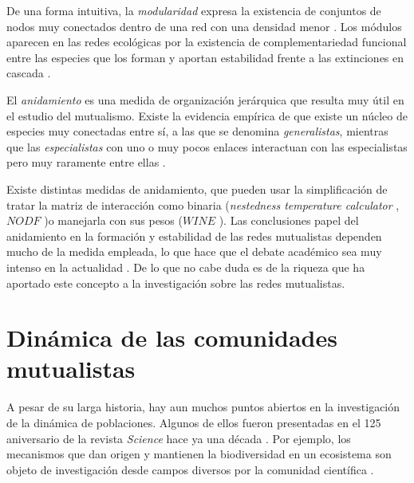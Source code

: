 De una forma intuitiva, la \textit{modularidad} expresa la existencia de conjuntos de nodos muy conectados dentro de una red con una densidad menor \cite{newman2006modularity}. Los módulos aparecen en las redes ecológicas por la existencia de complementariedad funcional entre las especies que los forman y aportan estabilidad frente a las extinciones en cascada \cite{olesen2007modularity, thebault2010stability, stouffer2011compartmentalization}.

El \textit{anidamiento} es una medida de organización jerárquica \cite{atmar1986nested} que resulta muy útil en el estudio del mutualismo. Existe la evidencia empírica de que existe un núcleo de especies muy conectadas entre sí, a las que se denomina \textit{generalistas}, mientras que las \textit{especialistas} con uno o muy pocos enlaces interactuan con las especialistas pero muy raramente entre ellas \cite{bascompte2003nested, krishna2008neutral}.

Existe distintas medidas de anidamiento, que pueden usar la simplificación de tratar la matriz de interacción como binaria (\textit{nestedness temperature calculator} \cite{atmar1995nestedness}, $NODF$ \cite{almeida2008consistent})o manejarla con sus pesos ($WINE$ \cite{galeano2009weighted}). Las conclusiones papel del anidamiento en la formación y estabilidad de las redes mutualistas dependen mucho de la medida empleada, lo que hace que el debate académico sea muy intenso en la actualidad \cite{staniczenko2013ghost, strona2015new}. De lo que no cabe duda es de la riqueza que ha aportado este concepto a la investigación sobre las redes mutualistas.

\section{Dinámica de las comunidades mutualistas}

A pesar de su larga historia, hay aun muchos puntos abiertos en la investigación de la dinámica de poblaciones. Algunos de ellos fueron presentadas en el 125 aniversario de la revista {\em Science} hace ya una década  \cite{kennedy2005,pennisi2005,stokstad2005}. Por ejemplo, los mecanismos que dan origen y mantienen la biodiversidad en un ecosistema son objeto de investigación desde campos diversos por la comunidad científica \cite{williams2000,dunne2002biodiversity,olesen2007modularity,allesina2008,bascompte2009,saavedra2009,bastolla2009,fortuna2010nestedness,encinas2012}.  

